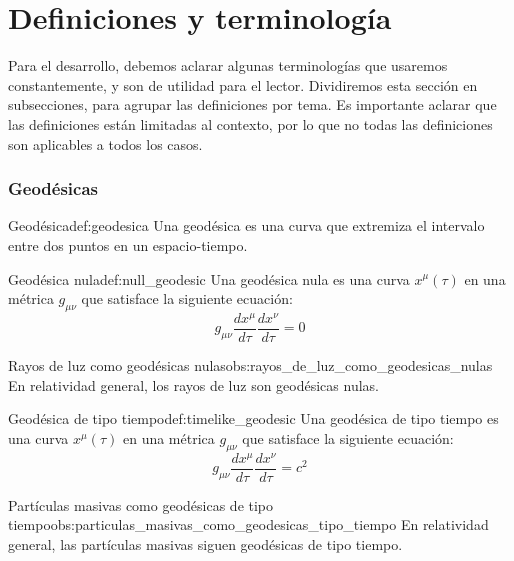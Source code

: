 \section{Definiciones y terminología}

Para el desarrollo, debemos aclarar algunas terminologías que usaremos constantemente, y son de utilidad para el lector. Dividiremos esta sección en subsecciones, para agrupar las definiciones por tema. Es importante aclarar que las definiciones están limitadas al contexto, por lo que no todas las definiciones son aplicables a todos los casos.

\subsubsection{Geodésicas}

\begin{definicion}{Geodésica}{def:geodesica}
    Una geodésica es una curva que extremiza el intervalo entre dos puntos en un espacio-tiempo. \cite{ridpath2012dictionary}
\end{definicion}

\begin{definicion}{Geodésica nula}{def:null_geodesic}
    Una geodésica nula es una curva $x^\mu(\tau)$ en una métrica $g_{\mu\nu}$ que satisface la siguiente ecuación:
    \begin{equation}
    g_{\mu\nu} \frac{dx^\mu}{d\tau} \frac{dx^\nu}{d\tau} = 0 \label{eq:null_geodesic}
    \end{equation} \cite[p. 309]{soffel2019applied}
\end{definicion}

\begin{observacion}{Rayos de luz como geodésicas nulas}{obs:rayos_de_luz_como_geodesicas_nulas}
    En relatividad general, los rayos de luz son geodésicas nulas. \cite[p. 309]{soffel2019applied}
\end{observacion}

\begin{definicion}{Geodésica de tipo tiempo}{def:timelike_geodesic}
    Una geodésica de tipo tiempo es una curva $x^\mu(\tau)$ en una métrica $g_{\mu\nu}$ que satisface la siguiente ecuación:
    \begin{equation}
    g_{\mu\nu} \frac{dx^\mu}{d\tau} \frac{dx^\nu}{d\tau} = c^2 \label{eq:timelike_geodesic}
    \end{equation} \cite[p. 169]{soffel2019applied}
\end{definicion}

\begin{observacion}{Partículas masivas como geodésicas de tipo tiempo}{obs:particulas_masivas_como_geodesicas_tipo_tiempo}
    En relatividad general, las partículas masivas siguen geodésicas de tipo tiempo. \cite[p. 169]{soffel2019applied}
\end{observacion}
